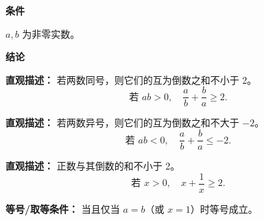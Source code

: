 \begin{statementbox}

\textbf{\textcolor{CStatement}{条件}}
\begin{description}[style=nextline, leftmargin=2.8em, labelsep=0.5em, itemsep=0.35em]
    \item[\textbf{\textcolor{CStatement}{条件 1（非零实数）：}}] $a, b$ 为非零实数。
\end{description}

\textbf{\textcolor{CStatement}{结论}}
\begin{description}[style=nextline, leftmargin=2.8em, labelsep=0.5em, itemsep=0.45em]
    \item[\textbf{\textcolor{CStatement}{结论一（同号倒数下界）：}}]
    \textbf{\textcolor{CStatement}{直观描述：}} 若两数同号，则它们的互为倒数之和不小于 2。
    \[
    \text{若 } ab > 0,\quad \frac{a}{b} + \frac{b}{a} \geq 2.
    \]

    \item[\textbf{\textcolor{CStatement}{结论二（异号倒数上界）：}}]
    \textbf{\textcolor{CStatement}{直观描述：}} 若两数异号，则它们的互为倒数之和不大于 $-2$。
    \[
    \text{若 } ab < 0,\quad \frac{a}{b} + \frac{b}{a} \leq -2.
    \]

    \item[\textbf{\textcolor{CStatement}{推广结论（正数倒数和）：}}]
    \textbf{\textcolor{CStatement}{直观描述：}} 正数与其倒数的和不小于 2。
    \[
    \text{若 } x > 0,\quad x + \frac{1}{x} \geq 2.
    \]
\end{description}

\textbf{\textcolor{CStatement}{等号/取等条件：}} 当且仅当 $a = b$（或 $x = 1$）时等号成立。

\end{statementbox}
